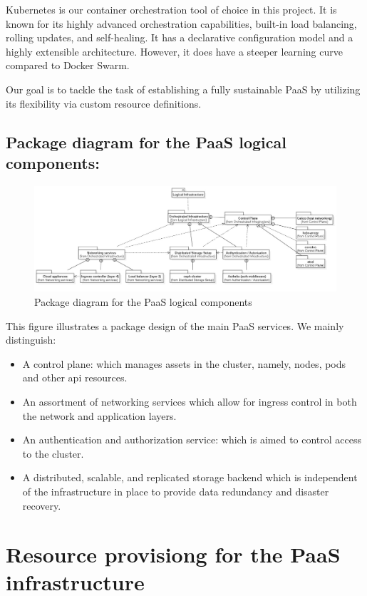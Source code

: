 Kubernetes is our container orchestration tool of choice in this project. It is known for its highly advanced orchestration capabilities, built-in load balancing, rolling updates, and self-healing. It has a declarative configuration model and a highly extensible architecture. However, it does have a steeper learning curve compared to Docker Swarm.  

Our goal is to tackle the task of establishing a fully sustainable PaaS by utilizing its flexibility via custom resource definitions. 

\subsection{Package diagram for the PaaS logical components:}

\begin{figure}[H]\centering
\includegraphics[width=1.0\textwidth,angle=00]{assets/f12.jpg}
\caption{Package diagram for the PaaS logical components}
\label{fig:Package diagram for the PaaS logical components}
\end{figure}

This figure illustrates a package design of the main PaaS services. We mainly distinguish: 
\begin{itemize}[label={--}]
\item  A control plane: which manages assets in the cluster, namely, nodes, pods and other api resources. 
\item An assortment of networking services which allow for ingress control in both the network and application layers. 
\item An authentication and authorization service: which is aimed to control access to the cluster. 
\item A distributed, scalable, and replicated storage backend which is independent of the infrastructure in place to provide data redundancy and disaster recovery. 
\end{itemize}
\newpage
\section{Resource provisiong for the PaaS infrastructure}
